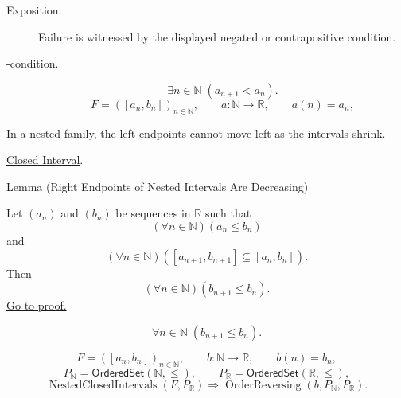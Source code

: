 \begin{remark*}
\begin{description}
  \item[Exposition.]
  Failure is witnessed by the displayed negated or contrapositive condition.

  \item[\exists-condition.]
  \[
\exists n\in\mathbb{N}\;(a_{n+1}<a_n).
\]
\[
F=([a_n,b_n])_{n\in\mathbb{N}},\qquad
a\colon\mathbb{N}\longrightarrow\mathbb{R},\qquad a(n)=a_n,
\]
\end{description}
\end{remark*}

\begin{remark*}[Interpretation]
In a nested family, the left endpoints cannot move left as the intervals
shrink.
\end{remark*}

\begin{dependencies}
\hyperref[def:closed-interval]{Closed Interval}.
\end{dependencies}

\begin{lemmabox}{Lemma (Right Endpoints of Nested Intervals Are Decreasing)}
\begin{lemma}
\label{lem:right-endpoints-nested-intervals-decreasing}
Let $(a_n)$ and $(b_n)$ be sequences in $\mathbb{R}$ such that
\[
  (\forall n\in\mathbb{N})(a_n\leq b_n)
\]
and
\[
  (\forall n\in\mathbb{N})([a_{n+1},b_{n+1}]\subseteq [a_n,b_n]).
\]
Then
\[
  (\forall n\in\mathbb{N})(b_{n+1}\leq b_n).
\]
\hyperref[prf:right-endpoints-nested-intervals-decreasing]{Go to proof.}
\end{lemma}
\end{lemmabox}

\begin{remark*}
\[
\forall n\in\mathbb{N}\;(b_{n+1}\le b_n).
\]
\end{remark*}

\begin{remark*}
\[
F=([a_n,b_n])_{n\in\mathbb{N}},\qquad
b\colon\mathbb{N}\longrightarrow\mathbb{R},\qquad b(n)=b_n,
\]
\[
P_{\mathbb{N}}=\mathsf{OrderedSet}(\mathbb{N},\leq),\qquad
P_{\mathbb{R}}=\mathsf{OrderedSet}(\mathbb{R},\leq),
\]
\[
\operatorname{NestedClosedIntervals}(F,P_{\mathbb{R}})
\Longrightarrow
\operatorname{OrderReversing}(b,P_{\mathbb{N}},P_{\mathbb{R}}).
\]
\end{remark*}


